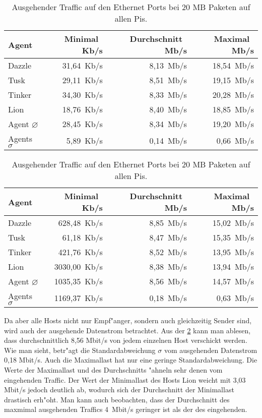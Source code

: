 \begin{table}
\centering
\begin{tabular}{l%
 r<{\,Kb/s}%
 r<{\,Mb/s}%
 r<{\,Mb/s}%
}
Agent  				& Minimal		& Durchschnitt		& Maximal	\\
\hline
Dazzle 				& 31,64			& 8,13 			& 18,54		\\
Tusk 				& 29,11			& 8,51			& 19,15		\\
Tinker				& 34,30			& 8,33			& 20,28		\\
Lion				& 18,76			& 8,40			& 18,85		\\ 
Agent $\diameter $	 	& 28,45			& 8,34			& 19,20	\\   
Agents $\sigma $		& 5,89			& 0,14			& 0,66		\\

\end{tabular}
\caption{Eingehender Traffic auf den Ethernet Ports bei 20 Megabyte Paketen auf allen Pis.}
\label{tab:EingehenderTraffic20Mb}

\begin{tabular}{l%
 r<{\,Kb/s}%
 r<{\,Mb/s}%
 r<{\,Mb/s}%
}
Agent  				& Minimal		& Durchschnitt		& Maximal	\\	
\hline
Dazzle 				& 628,48		& 8,85	 		& 15,02		\\
Tusk 				& 61,18			& 8,47			& 15,35		\\
Tinker				& 421,76		& 8,52			& 13,95		\\
Lion				& 3030,00		& 8,38			& 13,94		\\ 
Agent $\diameter $	 	& 1035,35		& 8,56			& 14,57	\\   
Agents $\sigma $		& 1169,37		& 0,18			& 0,63		\\

\end{tabular}
\caption{Ausgehender Traffic auf den Ethernet Ports bei 20 MB Paketen auf allen Pis.}
\label{tab:AusgehenderTraffic20Mb}

\end{table}

Da aber alle Hosts nicht nur Empf"anger, sondern auch gleichzeitig Sender sind, wird auch der ausgehende %
Datenstrom betrachtet. Aus der \cref{tab:AusgehenderTraffic20Mb} kann man ablesen, dass durchschnittlich %
8,56 Mbit/s von jedem einzelnen Host verschickt werden. Wie man sieht, betr"agt die Standardabweichung %
$\sigma$ vom ausgehenden Datenstrom 0,18 Mbit/s. Auch die Maximallast hat nur eine geringe Standardabweichung. %
Die Werte der Maximallast und des Durchschnitts "ahneln sehr denen vom eingehenden Traffic. %
Der Wert der Minimallast des Hosts Lion weicht mit 3,03 Mbit/s jedoch deutlich ab, wodurch sich der %
Durchschnitt der Minimallast drastisch erh"oht. %
Man kann auch beobachten, dass der Durchschnitt des maxmimal ausgehenden Traffics \mbox{4 Mbit/s} %
geringer ist als der des eingehenden. %

